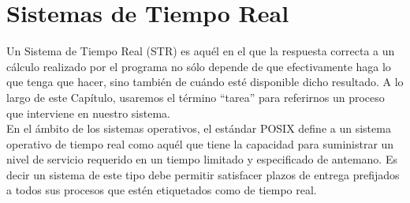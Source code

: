 \chapter{Sistemas de Tiempo Real}

Un Sistema de Tiempo Real (STR) es aquél en el que la respuesta correcta a un cálculo realizado por el programa no sólo depende de que efectivamente haga lo que tenga que hacer, sino también de cuándo esté disponible dicho resultado. A lo largo de este Capítulo, usaremos el término ``tarea'' para referirnos un proceso que interviene en nuestro sistema.\\

En el ámbito de los sistemas operativos, el estándar POSIX define a un sistema operativo de tiempo real como aquél que tiene la capacidad para suministrar un nivel de servicio requerido en un tiempo limitado y especificado de antemano. Es decir un sistema de este tipo debe permitir satisfacer plazos de entrega prefijados a todos sus procesos que estén etiquetados como de tiempo real.

